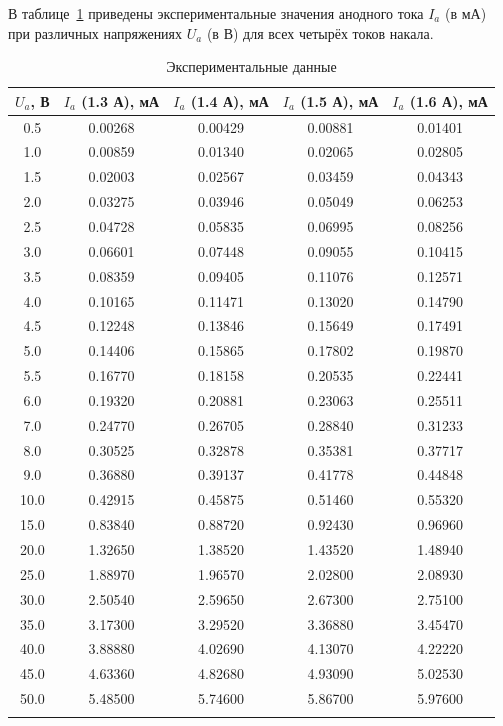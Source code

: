 \documentclass[a4paper]{article}
\begin{document}
	В таблице~\ref{tab:data} приведены экспериментальные значения анодного тока $I_a$ (в мА) при различных напряжениях $U_a$ (в В) для всех четырёх токов накала.
	
	\begin{longtable}{|c|c|c|c|c|}
		\hline
		$U_a$, В & $I_a$ (1.3 А), мА & $I_a$ (1.4 А), мА & $I_a$ (1.5 А), мА & $I_a$ (1.6 А), мА \\
		\hline
		0.5  & 0.00268  & 0.00429  & 0.00881  & 0.01401  \\
		1.0  & 0.00859  & 0.01340  & 0.02065  & 0.02805  \\
		1.5  & 0.02003  & 0.02567  & 0.03459  & 0.04343  \\
		2.0  & 0.03275  & 0.03946  & 0.05049  & 0.06253  \\
		2.5  & 0.04728  & 0.05835  & 0.06995  & 0.08256  \\
		3.0  & 0.06601  & 0.07448  & 0.09055  & 0.10415  \\
		3.5  & 0.08359  & 0.09405  & 0.11076  & 0.12571  \\
		4.0  & 0.10165  & 0.11471  & 0.13020  & 0.14790  \\
		4.5  & 0.12248  & 0.13846  & 0.15649  & 0.17491  \\
		5.0  & 0.14406  & 0.15865  & 0.17802  & 0.19870  \\
		5.5  & 0.16770  & 0.18158  & 0.20535  & 0.22441  \\
		6.0  & 0.19320  & 0.20881  & 0.23063  & 0.25511  \\
		7.0  & 0.24770  & 0.26705  & 0.28840  & 0.31233  \\
		8.0  & 0.30525  & 0.32878  & 0.35381  & 0.37717  \\
		9.0  & 0.36880  & 0.39137  & 0.41778  & 0.44848  \\
		10.0 & 0.42915  & 0.45875  & 0.51460  & 0.55320  \\
		15.0 & 0.83840  & 0.88720  & 0.92430  & 0.96960  \\
		20.0 & 1.32650  & 1.38520  & 1.43520  & 1.48940  \\
		25.0 & 1.88970  & 1.96570  & 2.02800  & 2.08930  \\
		30.0 & 2.50540  & 2.59650  & 2.67300  & 2.75100  \\
		35.0 & 3.17300  & 3.29520  & 3.36880  & 3.45470  \\
		40.0 & 3.88880  & 4.02690  & 4.13070  & 4.22220  \\
		45.0 & 4.63360  & 4.82680  & 4.93090  & 5.02530  \\
		50.0 & 5.48500  & 5.74600  & 5.86700  & 5.97600  \\
		\hline
		\caption{Экспериментальные данные}
		\label{tab:data}
	\end{longtable}
	
\end{document}
